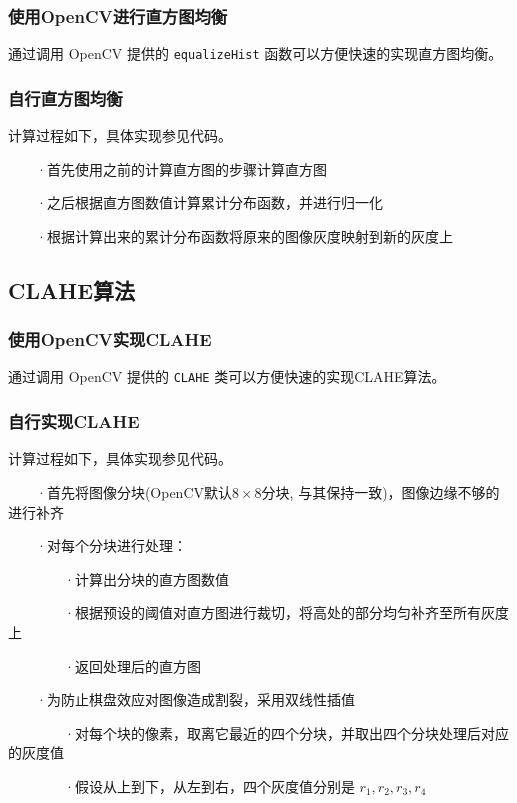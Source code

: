 \documentclass{article}
\begin{document}
\subsubsection{使用OpenCV进行直方图均衡}

通过调用 OpenCV 提供的 \texttt{equalizeHist} 函数可以方便快速的实现直方图均衡。

\subsubsection{自行直方图均衡}

计算过程如下，具体实现参见代码。

~~~~·首先使用之前的计算直方图的步骤计算直方图

~~~~·之后根据直方图数值计算累计分布函数，并进行归一化

~~~~·根据计算出来的累计分布函数将原来的图像灰度映射到新的灰度上

\subsection{CLAHE算法}

\subsubsection{使用OpenCV实现CLAHE}

通过调用 OpenCV 提供的 \texttt{CLAHE} 类可以方便快速的实现CLAHE算法。

\subsubsection{自行实现CLAHE}

计算过程如下，具体实现参见代码。

~~~~·首先将图像分块(OpenCV默认$8\times 8$分块, 与其保持一致)，图像边缘不够的进行补齐

~~~~·对每个分块进行处理：

~~~~~~~~·计算出分块的直方图数值

~~~~~~~~·根据预设的阈值对直方图进行裁切，将高处的部分均匀补齐至所有灰度上

~~~~~~~~·返回处理后的直方图

~~~~·为防止棋盘效应对图像造成割裂，采用双线性插值

~~~~~~~~·对每个块的像素，取离它最近的四个分块，并取出四个分块处理后对应的灰度值

~~~~~~~~·假设从上到下，从左到右，四个灰度值分别是 $r_1, r_2, r_3, r_4$
\end{document}
